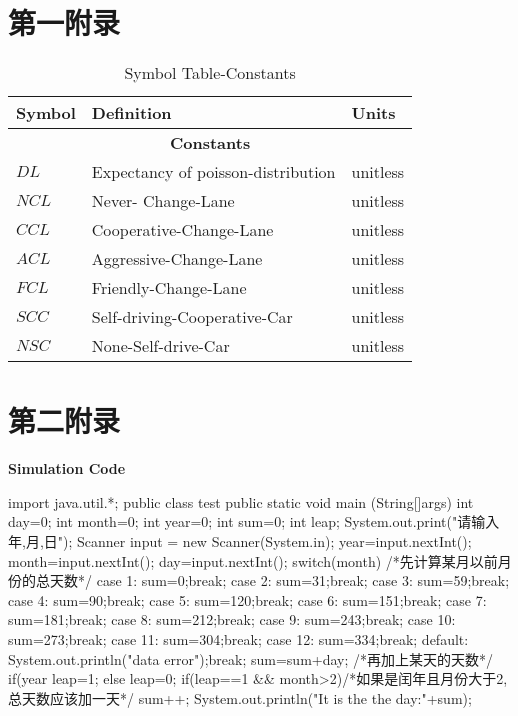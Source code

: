 \newpage
\appendix

\section{第一附录}



\begin{table}[H]
\caption{Symbol Table-Constants}
\centering
\begin{tabular}{lll}
\toprule
Symbol & Definition  & Units\\
\midrule[2pt]
\multicolumn{3}{c}{\textbf{Constants} }\\
$DL$&Expectancy of poisson-distribution &  unitless \\
$NCL$ &Never- Change-Lane& unitless\\
$CCL$&Cooperative-Change-Lane& unitless\\
$ACL$&Aggressive-Change-Lane& unitless\\
$FCL$&Friendly-Change-Lane& unitless\\
$SCC$&Self-driving-Cooperative-Car& unitless\\
$NSC$&None-Self-drive-Car& unitless\\
\bottomrule
\end{tabular}
\end{table}


\section{第二附录}
\textcolor[rgb]{0.98,0.00,0.00}{\textbf{Simulation Code}}
\begin{python}
import java.util.*;  
public class test {  
    public static void main (String[]args){   
        int day=0;  
        int month=0;  
        int year=0;  
        int sum=0;  
        int leap;     
        System.out.print("请输入年,月,日\n");     
        Scanner input = new Scanner(System.in);  
        year=input.nextInt();  
        month=input.nextInt();  
        day=input.nextInt();  
        switch(month) /*先计算某月以前月份的总天数*/    
        {     
        case 1:  
            sum=0;break;     
        case 2:  
            sum=31;break;     
        case 3:  
            sum=59;break;     
        case 4:  
            sum=90;break;     
        case 5:  
            sum=120;break;     
        case 6:  
            sum=151;break;     
        case 7:  
            sum=181;break;     
        case 8:  
            sum=212;break;     
        case 9:  
            sum=243;break;     
        case 10:  
            sum=273;break;     
        case 11:  
            sum=304;break;     
        case 12:  
            sum=334;break;     
        default:  
            System.out.println("data error");break;  
        }     
        sum=sum+day; /*再加上某天的天数*/    
        if(year%
            leap=1;     
        else    
            leap=0;     
        if(leap==1 && month>2)/*如果是闰年且月份大于2,总天数应该加一天*/    
            sum++;     
        System.out.println("It is the the day:"+sum);  
        }  
} 
\end{python}


